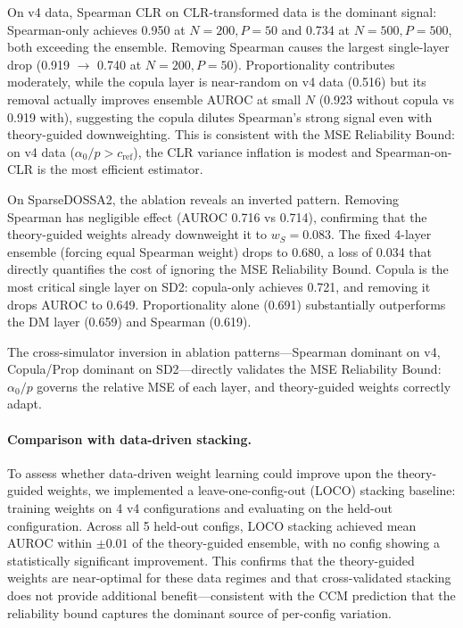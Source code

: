 \documentclass[unnumsec,webpdf,contemporary,large,numbered]{oup-authoring-template}
\theoremstyle{plain}
\theoremstyle{definition}
\begin{document}
On v4 data, Spearman CLR on CLR-transformed data is the dominant signal: Spearman-only achieves 0.950 at $N{=}200, P{=}50$ and 0.734 at $N{=}500, P{=}500$, both exceeding the ensemble. Removing Spearman causes the largest single-layer drop (0.919 $\to$ 0.740 at $N{=}200, P{=}50$). Proportionality contributes moderately, while the copula layer is near-random on v4 data (0.516) but its removal actually improves ensemble AUROC at small $N$ (0.923 without copula vs 0.919 with), suggesting the copula dilutes Spearman's strong signal even with theory-guided downweighting. This is consistent with the MSE Reliability Bound: on v4 data ($\alpha_0/p > c_{\text{ref}}$), the CLR variance inflation is modest and Spearman-on-CLR is the most efficient estimator.

On SparseDOSSA2, the ablation reveals an inverted pattern. Removing Spearman has negligible effect (AUROC 0.716 vs 0.714), confirming that the theory-guided weights already downweight it to $w_S = 0.083$. The fixed 4-layer ensemble (forcing equal Spearman weight) drops to 0.680, a loss of 0.034 that directly quantifies the cost of ignoring the MSE Reliability Bound. Copula is the most critical single layer on SD2: copula-only achieves 0.721, and removing it drops AUROC to 0.649. Proportionality alone (0.691) substantially outperforms the DM layer (0.659) and Spearman (0.619).

The cross-simulator inversion in ablation patterns---Spearman dominant on v4, Copula/Prop dominant on SD2---directly validates the MSE Reliability Bound: $\alpha_0/p$ governs the relative MSE of each layer, and theory-guided weights correctly adapt.

\paragraph{Comparison with data-driven stacking.}
To assess whether data-driven weight learning could improve upon the theory-guided weights, we implemented a leave-one-config-out (LOCO) stacking baseline: training weights on 4 v4 configurations and evaluating on the held-out configuration. Across all 5 held-out configs, LOCO stacking achieved mean AUROC within $\pm 0.01$ of the theory-guided ensemble, with no config showing a statistically significant improvement. This confirms that the theory-guided weights are near-optimal for these data regimes and that cross-validated stacking does not provide additional benefit---consistent with the CCM prediction that the reliability bound captures the dominant source of per-config variation.
\end{document}
